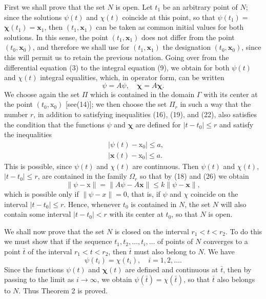 \documentclass[10pt,a5paper]{book}
\makeatletter
\theoremstyle{plain}
\theoremstyle{definition}
\theoremstyle{remark}
\renewenvironment{proof}[1][\proofname]{\par
  \pushQED{\qed}%
  \normalfont\topsep6\p@\@plus6\p@\relax
  \trivlist
  \item\relax{\itshape #1\@addpunct{.}}\hspace\labelsep\ignorespaces
}{\popQED\endtrivlist\@endpefalse}
\makeatother
\begin{document}
\begin{proof}[Proof of Theorem 2]
First we shall prove that the set $N$ is open. Let $t_{1}$ be an arbitrary point of $N$; since the solutions $\psi(t)$ and $\chi(t)$ coincide at this point, so that $\psi\left(t_{1}\right)=$ $\boldsymbol{\chi}\left(t_{1}\right)=\mathbf{x}_{1}$, then $\left(t_{1}, \mathbf{x}_{1}\right)$ can be taken as common initial values for both solutions. In this sense, the point $\left(t_{1}, \mathbf{x}_{1}\right)$ does not differ from the point $\left(t_{0}, \mathbf{x}_{0}\right)$, and therefore we shall use for $\left(t_{1}, \mathbf{x}_{1}\right)$ the designation $\left(t_{0}, \mathbf{x}_{0}\right)$, since this will permit us to retain the previous notation. Going over from the differential equation (3) to the integral equation (9), we obtain for both $\psi(t)$ and $\chi(t)$ integral equalities, which, in operator form, can be written
\begin{equation*}
\psi=A \psi, \quad \boldsymbol{\chi}=A \boldsymbol{\chi} . \tag{26}
\end{equation*}
We choose again the set $\Pi$ which is contained in the domain $\Gamma$ with its center at the point $\left(t_{0}, \mathrm{x}_{0}\right)$ [see(14)]; we then choose the set $\Pi_{r}$ in such a way that the number $r$, in addition to satisfying inequalities (16), (19), and (22), also satisfies the condition that the functions $\psi$ and $\boldsymbol{\chi}$ are defined for $\left|t-t_{0}\right| \leq r$ and satisfy the inequalities
\[
\begin{aligned}
& \left|\psi(t)-\mathrm{x}_{0}\right| \leq a, \\
& \left|\boldsymbol{x}(t)-\mathrm{x}_{0}\right| \leq a .
\end{aligned}
\]
This is possible, since $\psi(t)$ and $\chi(t)$ are continuous. Then $\psi(t)$ and $\chi(t)$, $\left|t-t_{0}\right| \leq r$, are contained in the family $\Omega_{r}$ so that by (18) and (26) we obtain
\[
\|\psi-\mathrm{x}\|=\|A \psi-A \boldsymbol{x}\| \leq k\|\psi-\boldsymbol{x}\|,
\]
which is possible only if $\|\psi-x\|=0$, that is, if $\psi$ and $\chi$ coincide on the interval $\left|t-t_{0}\right| \leq r$. Hence, whenever $t_{0}$ is contained in $N$, the set $N$ will also contain some interval $\left|t-t_{0}\right|<r$ with its center at $t_{0}$, so that $N$ is open.

We shall now prove that the set $N$ is closed on the interval $r_{1}<t<r_{2}$. To do this we must show that if the sequence $t_{1}, t_{2}, \ldots, t_{i}, \ldots$ of points of $N$ converges to a point $\bar{t}$ of the interval $r_{1}<t<r_{2}$, then $\bar{t}$ must also belong to $N$. We have
\[
\psi\left(t_{i}\right)=\chi\left(t_{i}\right), \quad i=1,2, \ldots .
\]
Since the functions $\psi(t)$ and $\boldsymbol{\chi}(t)$ are defined and continuous at $\bar{t}$, then by passing to the limit as $i \rightarrow \infty$, we obtain $\psi(\bar{t})=\chi(\bar{t})$, so that $\bar{t}$ also belongs to $N$. Thus Theorem 2 is proved.
\end{proof}
\end{document}
